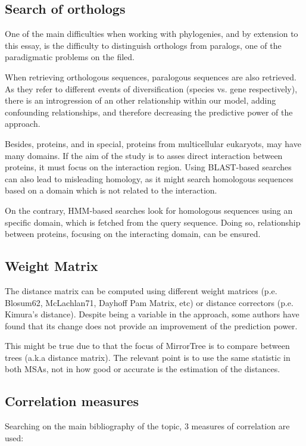\documentclass[11pt]{article}
\begin{document}
\subsection{Search of orthologs}
One of the main difficulties when working with phylogenies, and by extension to this essay, is the difficulty to distinguish orthologs from paralogs, one of the paradigmatic problems on the filed. 

When retrieving orthologous sequences, paralogous sequences are also retrieved. As they refer to different events of diversification (species vs. gene respectively), there is an introgression of an other relationship within our model, adding confounding relationships, and therefore decreasing the predictive power of the approach.

Besides, proteins, and in special, proteins from multicellular eukaryots, may have many domains. If the aim of the study is to asses direct interaction between proteins, it must focus on the interaction region. Using BLAST-based searches can also lead to misleading homology, as it might search homologous sequences based on a domain which is not related to the interaction.

On the contrary, HMM-based searches look for homologous sequences using an specific domain, which is fetched from the query sequence. Doing so, relationship between proteins, focusing on the interacting domain, can be ensured.


\subsection{Weight Matrix}
The distance matrix can be computed using different weight matrices (p.e. Blosum62, McLachlan71, Dayhoff Pam Matrix, etc) or distance correctors (p.e. Kimura's distance). Despite being a variable in the approach, some authors\cite{Zhou13} have found that its change does not provide an improvement of the prediction power.

This might be true due to that the focus of MirrorTree is to compare between trees (a.k.a distance matrix). The relevant point is to use the same statistic in both MSAs, not in how good or accurate is the estimation of the distances.

\subsection{Correlation measures}
Searching on the main bibliography of the topic, 3 measures of correlation are used:
\end{document}
